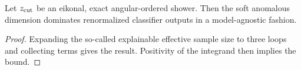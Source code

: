 \begin{corollary}\label{thm:2}
Let $z_{\rm cut}$ be an eikonal, exact angular-ordered shower. Then the
soft anomalous dimension dominates renormalized classifier outputs in a
model-agnostic fashion.
\end{corollary}

\begin{proof}
Expanding the so-called explainable effective sample size to three loops
and collecting terms gives the result. Positivity of the integrand then
implies the bound.
\end{proof}

